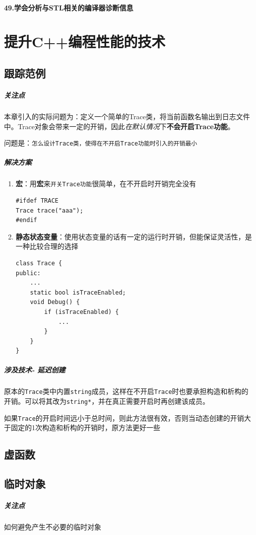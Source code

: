 \documentclass[UTF8,a4paper,12pt]{ctexbook}
\begin{document}
			\paragraph{49.学会分析与STL相关的编译器诊断信息}

	\section{提升C++编程性能的技术}
		\subsection{跟踪范例}
			\subparagraph{关注点} 本章引入的实际问题为：定义一个简单的Trace类，将当前函数名输出到日志文件中。Trace对象会带来一定的开销，因此\textit{在默认情况}下\textbf{不会开启Trace功能}。
			
			问题是：\verb|怎么设计Trace类，使得在不开启Trace功能时引入的开销最小|
			
			\subparagraph{解决方案} 
				\begin{enumerate}
					\item \textbf{宏}：用\textbf{宏}来\verb|开关Trace功能|很简单，在不开启时开销完全没有
					\begin{lstlisting}
#ifdef TRACE
Trace trace("aaa");
#endif
					\end{lstlisting}
						
					\item \textbf{静态状态变量}：使用状态变量的话有一定的运行时开销，但能保证灵活性，是一种比较合理的选择
					\begin{lstlisting}
class Trace {
public:
	...
	static bool isTraceEnabled;
	void Debug() {
		if (isTraceEnabled) {
			...
		}
	}
}
					\end{lstlisting}
				\end{enumerate}
				
			\subparagraph{涉及技术- 延迟创建} 原本的\verb|Trace|类中内置\verb|string|成员，这样在不开启\verb|Trace|时也要承担构造和析构的开销。可以将其改为\verb|string*|，并在真正需要开启时再创建该成员。
			
			如果\verb|Trace|的开启时间远小于总时间，则此方法很有效，否则当动态创建的开销大于固定的1次构造和析构的开销时，原方法更好一些
			
		\subsection{虚函数}
		\subsection{临时对象}
			\subparagraph{关注点} 如何避免产生不必要的临时对象
			
\end{document}
